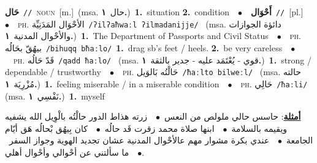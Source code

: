 \documentclass[10pt,a4paper,twoside]{article} %
\begin{document}
\begin{multicols}{2}
{\setlength\topsep{0pt}\textbf{\foreignlanguage{arabic}{حَال}}\ {\color{gray}\texttt{//}\color{black}}\ \textsc{noun}\ [m.]\ \color{gray}(msa. \foreignlanguage{arabic}{حال}~\foreignlanguage{arabic}{\textbf{١.}})\color{black}\ \textbf{1.}~situation  \textbf{2.}~condition\ \ $\bullet$\ \ \setlength\topsep{0pt}\textbf{\foreignlanguage{arabic}{أَحْوَال}}\ {\color{gray}\texttt{//}\color{black}}\ [pl.]\ \ $\bullet$\ \ \textsc{ph.} \color{gray} \foreignlanguage{arabic}{الأحْوَال المَدَنِيِّة}\color{black}\ {\color{gray}\texttt{/{\sffamily ʔilʔaħwaːl ʔilmadanijje}/}\color{black}}\ \color{gray} (msa. \foreignlanguage{arabic}{دائؤة الجوازات والأحْوال المدنية}~\foreignlanguage{arabic}{\textbf{١.}})\color{black}\ \textbf{1.}~The Department of Passports and Civil Status\ \ $\bullet$\ \ \textsc{ph.} \color{gray} \foreignlanguage{arabic}{بيهُقّ بحَالُه}\color{black}\ {\color{gray}\texttt{/{\sffamily bihuqq bħaːlo}/}\color{black}}\ \textbf{1.}~drag sb's feet / heels.  \textbf{2.}~be very careless\ \ $\bullet$\ \ \textsc{ph.} \color{gray} \foreignlanguage{arabic}{قَدّ حَالُه}\color{black}\ {\color{gray}\texttt{/{\sffamily qadd ħaːlo}/}\color{black}}\ \color{gray} (msa. \foreignlanguage{arabic}{قوي - يُعْتَمَد عليه - جدير بالثقة}~\foreignlanguage{arabic}{\textbf{١.}})\color{black}\ \textbf{1.}~strong / dependable / trustworthy\ \ $\bullet$\ \ \textsc{ph.} \color{gray} \foreignlanguage{arabic}{حَالْتُه بَالوَيل}\color{black}\ {\color{gray}\texttt{/{\sffamily ħaːlto bilweːl}/}\color{black}}\ \color{gray} (msa. \foreignlanguage{arabic}{حالته مُزْرِيَة}~\foreignlanguage{arabic}{\textbf{١.}})\color{black}\ \textbf{1.}~feeling miserable / in a miserable condition\ \ $\bullet$\ \ \textsc{ph.} \color{gray} \foreignlanguage{arabic}{حَالِي}\color{black}\ {\color{gray}\texttt{/{\sffamily ħaːli}/}\color{black}}\ \color{gray} (msa. \foreignlanguage{arabic}{نَفْسِي}~\foreignlanguage{arabic}{\textbf{١.}})\color{black}\ \textbf{1.}~myself\  \begin{flushright}\color{gray}\foreignlanguage{arabic}{\textbf{\underline{\foreignlanguage{arabic}{أمثلة}}}: حاسس حالي ملولص من النعس\ $\bullet$\ \  زرته هذاط الدور حالْتُه بالْوِيل الله يشفيه ويقيمه بالسلامة\ $\bullet$\ \  ابنها صلاة محمد زقرت قَد حالُه\ $\bullet$\ \  كان بِيهُق بْحالُه هَق أيّام الجامعة\ $\bullet$\ \  عندي بكرة مشوار مهم عالأحْوال المدنية عشان تجديد الهوية وجواز السفر\ $\bullet$\ \  ما سألتني عن أحْوالي وأحْوال أهلي.}\end{flushright}\color{black}} \vspace{2mm}


\end{multicols}
\end{document}
